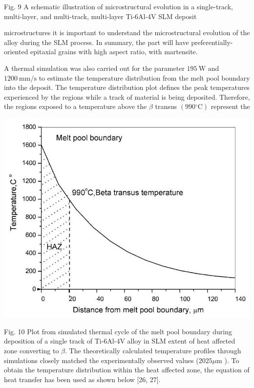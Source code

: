 \documentclass[10pt]{article}
\begin{document}
Fig. 9 A schematic illustration of microstructural evolution in a single-track, multi-layer, and multi-track, multi-layer Ti-6Al-4V SLM deposit

microstructures it is important to understand the microstructural evolution of the alloy during the SLM process. In summary, the part will have preferentially-oriented epitaxial grains with high aspect ratio, with martensite.

A thermal simulation was also carried out for the parameter $195 \mathrm{~W}$ and $1200 \mathrm{~mm} / \mathrm{s}$ to estimate the temperature distribution from the melt pool boundary into the deposit. The temperature distribution plot defines the peak temperatures experienced by the regions while a track of material is being deposited. Therefore, the regions exposed to a temperature above the $\beta$ transus $\left(990{ }^{\circ} \mathrm{C}\right)$ represent the

\begin{center}
\includegraphics[max width=\textwidth]{2024_02_28_5b6806184856c64a957ag-09(2)}
\end{center}

Fig. 10 Plot from simulated thermal cycle of the melt pool boundary during deposition of a single track of Ti-6Al-4V alloy in SLM extent of heat affected zone converting to $\beta$. The theoretically calculated temperature profiles through simulations closely matched the experimentally observed values (20$25 \mu \mathrm{m}$ ). To obtain the temperature distribution within the heat affected zone, the equation of heat transfer has been used as shown below [26, 27].
\end{document}
